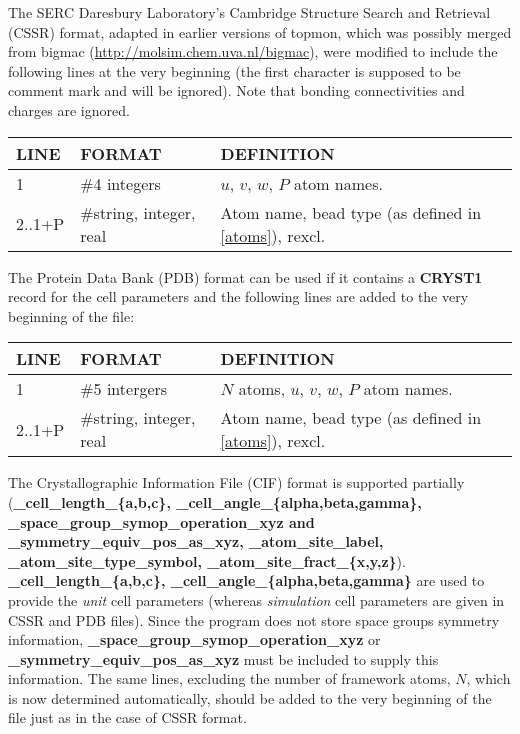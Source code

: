 \documentclass[12pt,letterpaper]{article}
\begin{document}
The SERC Daresbury Laboratory's Cambridge Structure Search
and Retrieval (CSSR) format, adapted in earlier versions of
topmon, which was possibly merged from bigmac
(\url{http://molsim.chem.uva.nl/bigmac}), were modified to
include the following lines at the very beginning (the first
character is supposed to be comment mark and will be
ignored). Note that bonding connectivities and charges are
ignored.
\begin{table}[h!]
\begin{tabular}{|l|l|l|}
\hline
LINE   & FORMAT                  & DEFINITION\\ \hline
1      & \#4 integers            & $u$, $v$, $w$, $P$ atom names.\\ \hline
2..1+P & \#string, integer, real & Atom name, bead type (as defined in \ref{atoms}), rexcl.\\ \hline
\end{tabular}
\end{table}

The Protein Data Bank (PDB) format can be used if it
contains a \textbf{CRYST1} record for the cell parameters
and the following lines are added to the very beginning of
the file:
\begin{table}[h!]
\begin{tabular}{|l|l|l|}
\hline
LINE   & FORMAT                  & DEFINITION\\ \hline
1      & \#5 intergers           & $N$ atoms, $u$, $v$, $w$, $P$ atom names.\\ \hline
2..1+P & \#string, integer, real & Atom name, bead type (as defined in \ref{atoms}), rexcl.\\ \hline
\end{tabular}
\end{table}

The Crystallographic Information File (CIF) format is
supported partially (\textbf{\_cell\_length\_\{a,b,c\},
  \_cell\_angle\_\{alpha,beta,gamma\},
  \_space\_group\_symop\_operation\_xyz and
  \_symmetry\_equiv\_pos\_as\_xyz, \_atom\_site\_label,
  \_atom\_site\_type\_symbol,
  \_atom\_site\_fract\_\{x,y,z\}}).
\textbf{\_cell\_length\_\{a,b,c\},
  \_cell\_angle\_\{alpha,beta,gamma\}} are used to provide
the \textit{unit} cell parameters (whereas
\textit{simulation} cell parameters are given in CSSR and
PDB files). Since the program does not store space groups
symmetry information,
\textbf{\_space\_group\_symop\_operation\_xyz} or
\textbf{\_symmetry\_equiv\_pos\_as\_xyz} must be included to
supply this information. The same lines, excluding the
number of framework atoms, $N$, which is now determined
automatically, should be added to the very beginning of the
file just as in the case of CSSR format.
\end{document}
